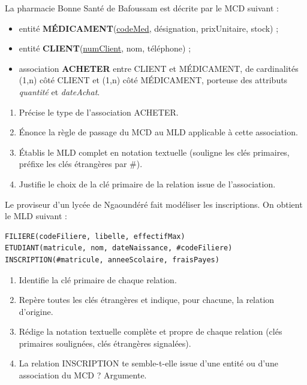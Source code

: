 \documentclass[11pt]{article}
\newcounter{popsec}
\newcounter{popsub}
\newcommand{\courssub}[1]{%
  \stepcounter{popsub}%
  \par\vspace{9pt}\noindent{\popxbold\fontsize{11.5}{13}\selectfont\color{popink}{\color{poporange}\thepopsec.\thepopsub}\hspace{6pt}#1}\par\nopagebreak\vspace{4pt}
}
\begin{document}
\courssub{Je m'entraîne}

\begin{exercice}
La pharmacie \og Bonne Santé \fg{} de Bafoussam est décrite par le MCD suivant :
\begin{itemize}
  \item entité \textbf{MÉDICAMENT}(\underline{codeMed}, désignation, prixUnitaire, stock) ;
  \item entité \textbf{CLIENT}(\underline{numClient}, nom, téléphone) ;
  \item association \textbf{ACHETER} entre CLIENT et MÉDICAMENT, de cardinalités (1,n) côté CLIENT et (1,n) côté MÉDICAMENT, porteuse des attributs \emph{quantité} et \emph{dateAchat}.
\end{itemize}
\begin{enumerate}
  \item Précise le type de l'association ACHETER.
  \item Énonce la règle de passage du MCD au MLD applicable à cette association.
  \item Établis le MLD complet en notation textuelle (souligne les clés primaires, préfixe les clés étrangères par \#).
  \item Justifie le choix de la clé primaire de la relation issue de l'association.
\end{enumerate}
\end{exercice}

\begin{exercice}
Le proviseur d'un lycée de Ngaoundéré fait modéliser les inscriptions. On obtient le MLD suivant :

\begin{lstlisting}
FILIERE(codeFiliere, libelle, effectifMax)
ETUDIANT(matricule, nom, dateNaissance, #codeFiliere)
INSCRIPTION(#matricule, anneeScolaire, fraisPayes)
\end{lstlisting}

\begin{enumerate}
  \item Identifie la clé primaire de chaque relation.
  \item Repère toutes les clés étrangères et indique, pour chacune, la relation d'origine.
  \item Rédige la notation textuelle complète et propre de chaque relation (clés primaires soulignées, clés étrangères signalées).
  \item La relation INSCRIPTION te semble-t-elle issue d'une entité ou d'une association du MCD ? Argumente.
\end{enumerate}
\end{exercice}
\end{document}

